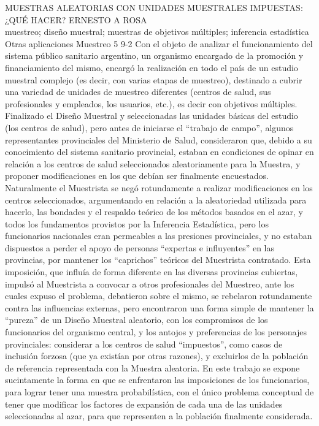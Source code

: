 \A
{MUESTRAS ALEATORIAS CON UNIDADES MUESTRALES IMPUESTAS: ¿QUÉ HACER?}
{ERNESTO A ROSA}
{
\\
}
{muestreo; diseño muestral; muestras de objetivos múltiples; inferencia estadística} 
 {Otras aplicaciones} 
 {Muestreo} 
 {5} 
 {9-2}
{Con el objeto de analizar el funcionamiento del sistema público sanitario argentino, un organismo encargado de la promoción y financiamiento del mismo, encargó la realización en todo el país de un estudio muestral complejo (es decir, con varias etapas de muestreo), destinado a cubrir una variedad de unidades de muestreo diferentes (centros de salud, sus profesionales y empleados, los usuarios, etc.), es decir con objetivos múltiples. Finalizado el Diseño Muestral y seleccionadas las unidades básicas del estudio (los centros de salud), pero antes de iniciarse el “trabajo de campo”, algunos representantes provinciales del Ministerio de Salud, consideraron que, debido a su conocimiento del sistema sanitario provincial, estaban en condiciones de opinar en relación a los centros de salud seleccionados aleatoriamente para la Muestra, y proponer modificaciones en los que debían ser finalmente encuestados. Naturalmente el Muestrista se negó rotundamente a realizar modificaciones en los centros seleccionados, argumentando en relación a la aleatoriedad utilizada para hacerlo, las bondades y el respaldo teórico de los métodos basados en el azar, y todos los fundamentos provistos por la Inferencia Estadística, pero los funcionarios nacionales eran permeables a las presiones provinciales, y no estaban dispuestos a perder el apoyo de personas “expertas e influyentes” en las provincias, por mantener los “caprichos” teóricos del Muestrista contratado. Esta imposición, que influía de forma diferente en las diversas provincias cubiertas, impulsó al Muestrista a convocar a otros profesionales del Muestreo, ante los cuales expuso el problema, debatieron sobre el mismo, se rebelaron rotundamente contra las influencias externas, pero encontraron una forma simple de mantener la “pureza” de un Diseño Muestral aleatorio, con los compromisos de los funcionarios del organismo central, y los antojos y preferencias de los personajes provinciales: considerar a los centros de salud “impuestos”, como casos de inclusión forzosa (que ya existían por otras razones), y excluirlos de la población de referencia representada con la Muestra aleatoria. En este trabajo se expone sucintamente la forma en que se enfrentaron las imposiciones de los funcionarios, para lograr tener una muestra probabilística, con el único problema conceptual de tener que modificar los factores de expansión de cada una de las unidades seleccionadas al azar, para que representen a la población finalmente considerada. }
